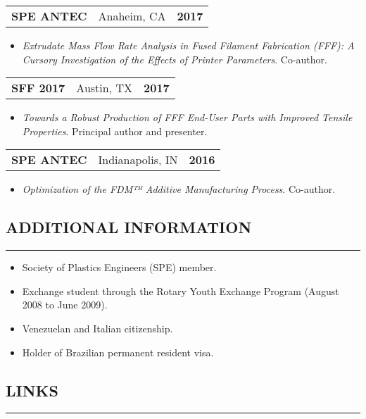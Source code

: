 \documentclass[11pt,letterpaper]{article}
\makeatletter
\newcommand{\headerrow}[3]
{\vspace{0.4em}
\noindent
\begin{tabular*}{\textwidth}{l @{\extracolsep{\fill}} cr}
	\textbf{#1} & %
	#2 &		  %
	\textbf{#3}\\ %
\end{tabular*}}
\makeatother
\begin{document}
	\headerrow
		{SPE ANTEC}
		{Anaheim, CA}
		{2017}
	\begin{itemize}
		\item \emph{Extrudate Mass Flow Rate Analysis in Fused Filament Fabrication (FFF): A Cursory Investigation of the Effects of Printer Parameters}. Co-author.
	\end{itemize}
	
	\headerrow
		{SFF 2017}
		{Austin, TX}
		{2017}
	\begin{itemize}
		\item \emph{Towards a Robust Production of FFF End-User Parts with Improved Tensile Properties}. Principal author and presenter.
	\end{itemize}
	
	\headerrow
		{SPE ANTEC}
		{Indianapolis, IN}
		{2016}
	\begin{itemize}
		\item \emph{Optimization of the FDM™ Additive Manufacturing Process}. Co-author.
	\end{itemize}

\subsection*{ADDITIONAL INFORMATION}
	\vspace{-0.5em}
	\hrule
	\vspace{0.8em}
	\begin{itemize}
		\item Society of Plastics Engineers (SPE) member.
		\item Exchange student through the Rotary Youth Exchange Program (August 2008 to June 2009).
		\item Venezuelan and Italian citizenship.
		\item Holder of Brazilian permanent resident visa.
	\end{itemize}
	
\subsection*{LINKS}
	\vspace{-0.5em}
	\hrule
	\vspace{-0.6em}
	
	\renewcommand{\theendnote}{ } %
	\theendnotes
	
\end{document}

